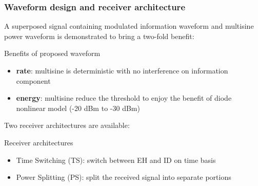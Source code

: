 \documentclass{beamer}
\begin{document}
\begin{frame}
\frametitle{Waveform design and receiver architecture}

A superposed signal containing \alert{modulated information waveform} and \alert{multisine power waveform} is demonstrated to bring a two-fold benefit:

\begin{block}{Benefits of proposed waveform}
\begin{itemize}
  \item \textbf{rate}: multisine is deterministic with no interference on information component
  \item \textbf{energy}: multisine reduce the threshold to enjoy the benefit of diode nonlinear model (-20 dBm to -30 dBm)
\end{itemize}
\end{block}

Two receiver architectures are available:

\begin{block}{Receiver architectures}
\begin{itemize}
  \item Time Switching (TS): switch between EH and ID on time basis
  \item Power Splitting (PS): split the received signal into separate portions
\end{itemize}
\end{block}

\end{frame}
\end{document}
